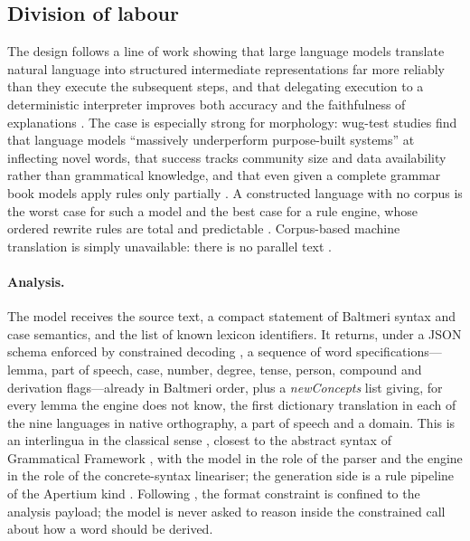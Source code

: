 \subsection{Division of labour}
The design follows a line of work showing that large language models translate natural language into structured intermediate representations far more reliably than they execute the subsequent steps, and that delegating execution to a deterministic interpreter improves both accuracy and the faithfulness of explanations \citep{gao2023,lyu2023,pan2023,olausson2023,cheng2023}. The case is especially strong for morphology: wug-test studies find that language models ``massively underperform purpose-built systems'' at inflecting novel words, that success tracks community size and data availability rather than grammatical knowledge, and that even given a complete grammar book models apply rules only partially \citep{weissweiler2023,pantelidou2026,tanzer2024,bean2024}. A constructed language with no corpus is the worst case for such a model and the best case for a rule engine, whose ordered rewrite rules are total and predictable \citep{kaplan1994}. Corpus-based machine translation is simply unavailable: there is no parallel text \citep{nllb2024}.

\paragraph{Analysis.} The model receives the source text, a compact statement of Baltmeri syntax and case semantics, and the list of known lexicon identifiers. It returns, under a JSON schema enforced by constrained decoding \citep{willard2023,geng2023}, a sequence of word specifications---lemma, part of speech, case, number, degree, tense, person, compound and derivation flags---already in Baltmeri order, plus a \emph{newConcepts} list giving, for every lemma the engine does not know, the first dictionary translation in each of the nine languages in native orthography, a part of speech and a domain. This is an interlingua in the classical sense \citep{hutchins1992}, closest to the abstract syntax of Grammatical Framework \citep{ranta2011}, with the model in the role of the parser and the engine in the role of the concrete-syntax lineariser; the generation side is a rule pipeline of the Apertium kind \citep{forcada2011}. Following \citet{tam2024}, the format constraint is confined to the analysis payload; the model is never asked to reason inside the constrained call about how a word should be derived.

